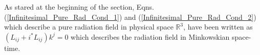 As stared at the beginning of the section, Eqns.(\ref{Infinitesimal_Pure_Rad_Cond_1}) and (\ref{Infinitesimal_Pure_Rad_Cond_2}) which describe a pure radiation field in physical space $\mathbb{R}^3$, have been written as $(L_{ij} + i ^*L_{ij}) k^j = 0$ which describes the radiation field in Minkowskian space-time.
   




  










